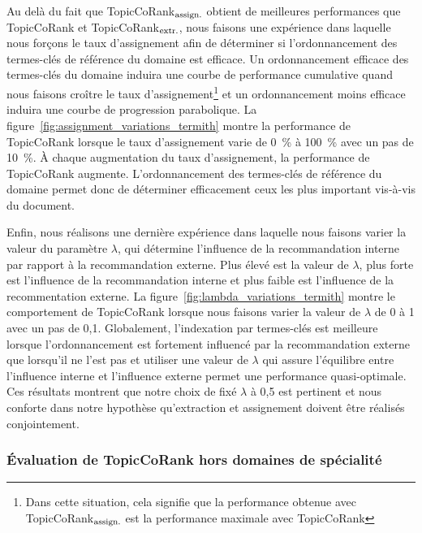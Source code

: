         Au delà du fait que TopicCoRank$_\textnormal{assign.}$ obtient de
        meilleures performances que TopicCoRank et
        TopicCoRank$_\textnormal{extr.}$, nous faisons une expérience dans
        laquelle nous forçons le taux d'assignement afin de déterminer si
        l'ordonnancement des termes-clés de référence du domaine est efficace.
        Un ordonnancement efficace des termes-clés du domaine induira une courbe
        de performance cumulative quand nous faisons croître le taux
        d'assignement\footnote{Dans cette situation, cela signifie que la
        performance obtenue avec TopicCoRank$_\textnormal{assign.}$ est la
        performance maximale avec TopicCoRank} et un ordonnancement moins
        efficace induira une courbe de progression parabolique. La
        figure~\ref{fig:assignment_variations_termith} montre la performance de
        TopicCoRank lorsque le taux d'assignement varie de 0~\% à 100~\% avec un
        pas de 10~\%. À chaque augmentation du taux d'assignement, la
        performance de TopicCoRank augmente. L'ordonnancement des termes-clés de
        référence du domaine permet donc de déterminer efficacement ceux les
        plus important vis-à-vis du document.
        

        Enfin, nous réalisons une dernière expérience dans laquelle nous faisons
        varier la valeur du paramètre $\lambda$, qui détermine l'influence de la
        recommandation interne par rapport à la recommandation externe. Plus
        élevé est la valeur de $\lambda$, plus forte est l'influence de la
        recommandation interne et plus faible est l'influence de la
        recommentation externe. La figure~\ref{fig:lambda_variations_termith}
        montre le comportement de TopicCoRank lorsque nous faisons varier la
        valeur de $\lambda$ de 0 à 1 avec un pas de 0,1. Globalement,
        l'indexation par termes-clés est meilleure lorsque l'ordonnancement est
        fortement influencé par la recommandation externe que lorsqu'il ne
        l'est pas et utiliser une valeur de $\lambda$ qui assure l'équilibre
        entre l'influence interne et l'influence externe permet une performance
        quasi-optimale. Ces résultats montrent que notre choix de fixé $\lambda$
        à 0,5 est pertinent et nous conforte dans notre hypothèse qu'extraction
        et assignement doivent être réalisés conjointement.
        
      
      \subsubsection{Évaluation de TopicCoRank hors domaines de spécialité}
      \label{subsubsec:main-domain_specific_keyphrase_annotation-supervised_automatic_keyphrase_annotation-evaluation-topiccorank_indepent_domains}

